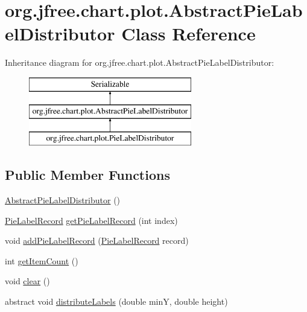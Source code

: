 \hypertarget{classorg_1_1jfree_1_1chart_1_1plot_1_1_abstract_pie_label_distributor}{}\section{org.\+jfree.\+chart.\+plot.\+Abstract\+Pie\+Label\+Distributor Class Reference}
\label{classorg_1_1jfree_1_1chart_1_1plot_1_1_abstract_pie_label_distributor}
Inheritance diagram for org.\+jfree.\+chart.\+plot.\+Abstract\+Pie\+Label\+Distributor\+:\begin{figure}[H]
\begin{center}
\leavevmode
\includegraphics[height=3.000000cm]{classorg_1_1jfree_1_1chart_1_1plot_1_1_abstract_pie_label_distributor}
\end{center}
\end{figure}
\subsection*{Public Member Functions}
\begin{DoxyCompactItemize}
\item 
\mbox{\hyperlink{classorg_1_1jfree_1_1chart_1_1plot_1_1_abstract_pie_label_distributor_afde6e18da10a61bc8d662f44aa43ad85}{Abstract\+Pie\+Label\+Distributor}} ()
\item 
\mbox{\hyperlink{classorg_1_1jfree_1_1chart_1_1plot_1_1_pie_label_record}{Pie\+Label\+Record}} \mbox{\hyperlink{classorg_1_1jfree_1_1chart_1_1plot_1_1_abstract_pie_label_distributor_af268d48505bf0ed03c4bc6b4e5c1b450}{get\+Pie\+Label\+Record}} (int index)
\item 
void \mbox{\hyperlink{classorg_1_1jfree_1_1chart_1_1plot_1_1_abstract_pie_label_distributor_a1f15a93250e65b65347899e22993f8cf}{add\+Pie\+Label\+Record}} (\mbox{\hyperlink{classorg_1_1jfree_1_1chart_1_1plot_1_1_pie_label_record}{Pie\+Label\+Record}} record)
\item 
int \mbox{\hyperlink{classorg_1_1jfree_1_1chart_1_1plot_1_1_abstract_pie_label_distributor_aaaf8f92e86eaee3b0c8016f78ff7e540}{get\+Item\+Count}} ()
\item 
void \mbox{\hyperlink{classorg_1_1jfree_1_1chart_1_1plot_1_1_abstract_pie_label_distributor_a1936d4757aba15058126bc42b80d7864}{clear}} ()
\item 
abstract void \mbox{\hyperlink{classorg_1_1jfree_1_1chart_1_1plot_1_1_abstract_pie_label_distributor_a0bc048b05cea4b4f2549c6511dd0a8aa}{distribute\+Labels}} (double minY, double height)
\end{DoxyCompactItemize}

